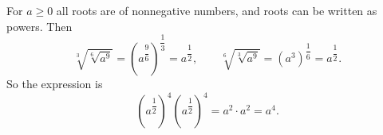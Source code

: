 For $a\ge0$ all roots are of nonnegative numbers, and roots can be written as powers. Then
\[
\sqrt[3]{\sqrt[6]{a^9}}=\left(a^{\dfrac{9}{6}}\right)^{\dfrac{1}{3}}=a^{\dfrac{1}{2}},
\qquad
\sqrt[6]{\sqrt[3]{a^9}}=\left(a^{3}\right)^{\dfrac{1}{6}}=a^{\dfrac{1}{2}}.
\]
So the expression is
\[
\left(a^{\dfrac{1}{2}}\right)^4\left(a^{\dfrac{1}{2}}\right)^4=a^2\cdot a^2=\boxed{a^4}.
\]
